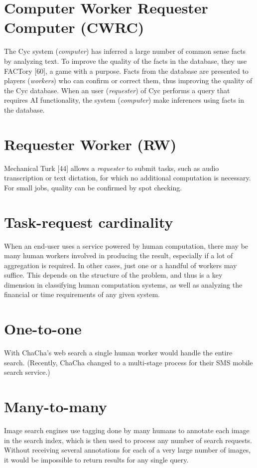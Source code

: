 \documentclass{acm_proc_article-sp}
\newcommand{\carrow}{\ding{225}}
\begin{document}
\section*{Computer \carrow Worker \carrow Requester \carrow Computer (CWRC)}
The Cyc system (\textit{computer}) has inferred a large number of common sense facts by analyzing text. To improve the quality of the facts in the database, they use FACTory [60], a game with a purpose. Facts from the database are presented to players (\textit{workers}) who can confirm or correct them, thus improving the quality of the Cyc database. When an user (\textit{requester}) of Cyc performs a query that requires AI functionality, the system (\textit{computer}) make inferences using facts in the database.
\section*{Requester \carrow Worker (RW)}
Mechanical Turk [44] allows a \textit{requester} to submit tasks, such as audio transcription or text dictation, for which no additional computation is necessary. For small jobs, quality can be confirmed by spot checking.
\section*{Task-request cardinality}
When an end-user uses a service powered by human computation, there may be many human workers involved in producing the result, especially if a lot of aggregation is required. In other cases, just one or a handful of workers may suffice. This depends on the structure of the problem, and thus is a key dimension in classifying human computation systems, as well as analyzing the financial or time requirements of any given system.
\section*{One-to-one}
With ChaCha’s web search a single human worker would handle the entire search. (Recently, ChaCha changed to a multi-stage process for their SMS mobile search service.)
\section*{Many-to-many}
Image search engines use tagging done by many humans to annotate each image in the search index, which is then used to process any number of search requests. Without receiving several annotations for each of a very large number of images, it would be impossible to return results for any single query.
\end{document}
